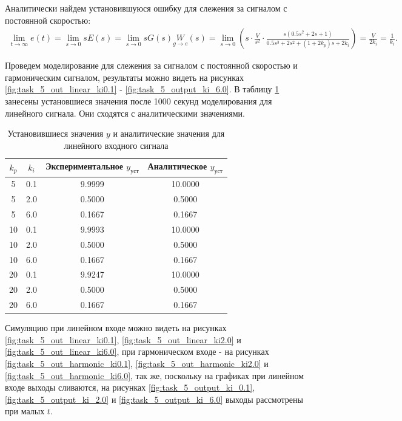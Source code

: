 Аналитически найдем установившуюся ошибку для слежения за сигналом с постоянной скоростью:
\begin{multline*}
    \lim_{t\rightarrow\infty}e(t)
    =\lim_{s\rightarrow0}sE(s)=\lim_{s\rightarrow0}sG(s)\underset{g\rightarrow e}{W}(s)
    =\lim_{s\rightarrow0}\left(s\cdot\frac{V}{s^2}\cdot\frac{s(0.5s^2+2s+1)}{0.5s^3+2s^2+(1+2k_p)s+2k_i}\right)
    =\frac{V}{2k_i}=\frac{1}{k_i}.
\end{multline*}

Проведем моделирование для слежения за сигналом с постоянной скоростью и гармоническим
сигналом, результаты можно видеть на рисунках \ref{fig:task_5_out_linear_ki0.1} - \ref{fig:task_5_output_ki_6.0}.
В таблицу \ref{tab:task_5_out} занесены установшиеся значения после 1000 секунд
моделирования для линейного сигнала. Они сходятся с аналитическими значениями.

\begin{table}[H]
    \centering
    \caption{Установившиеся значения $y$ и аналитические значения для линейного входного сигнала}
    \begin{tabular}{|c|c|c|c|}
        \hline
        $k_p$ & $k_i$ & Экспериментальное $y_{\text{уст}}$ & Аналитическое $y_{\text{уст}}$\\ \hline
        5 & 0.1 & 9.9999 & 10.0000 \\
        5 & 2.0 & 0.5000 & 0.5000 \\
        5 & 6.0 & 0.1667 & 0.1667 \\
        10 & 0.1 & 9.9993 & 10.0000 \\
        10 & 2.0 & 0.5000 & 0.5000 \\
        10 & 6.0 & 0.1667 & 0.1667 \\
        20 & 0.1 & 9.9247 & 10.0000 \\
        20 & 2.0 & 0.5000 & 0.5000 \\
        20 & 6.0 & 0.1667 & 0.1667 \\ \hline
    \end{tabular}
    \label{tab:task_5_out}
\end{table}

Симуляцию при линейном входе можно видеть на рисунках \ref{fig:task_5_out_linear_ki0.1}, \ref{fig:task_5_out_linear_ki2.0} и \ref{fig:task_5_out_linear_ki6.0},
при гармоническом входе - на рисунках \ref{fig:task_5_out_harmonic_ki0.1}, \ref{fig:task_5_out_harmonic_ki2.0} и \ref{fig:task_5_out_harmonic_ki6.0},
так же, поскольку на графиках при линейном входе выходы сливаются, на рисунках \ref{fig:task_5_output_ki_0.1}, \ref{fig:task_5_output_ki_2.0} и \ref{fig:task_5_output_ki_6.0}
выходы рассмотрены при малых $t$.


